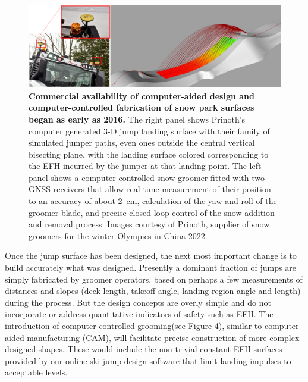 \documentclass[smallextended]{svjour3}       %
\begin{document}
%
\begin{figure}
  \centering
  \includegraphics[width=\columnwidth]{figures/prinoth.png}
  \caption{\textbf{Commercial availability of computer-aided design and
    computer-controlled fabrication of snow park surfaces began as early as
    2016.} The right panel shows Prinoth's computer generated 3-D jump landing
    surface with their family of simulated jumper paths, even ones outside the
    central vertical bisecting plane, with the landing surface colored
    corresponding to the EFH incurred by the jumper at that landing point. The
    left panel shows a computer-controlled snow groomer fitted with two GNSS
    receivers that allow real time measurement of their position to an accuracy
    of about 2~\si{\centi\meter}, calculation of the yaw and roll of the
    groomer blade, and precise closed loop control of the snow addition and
    removal process.  Images courtesy of Prinoth, supplier of snow groomers for
  the winter Olympics in China 2022.}
  \label{fig:prinoth}
\end{figure}

Once the jump surface has been designed, the next most important change is to build accurately what was designed. Presently a dominant fraction of jumps are simply
fabricated by groomer operators, based on perhaps a few measurements of
distances and slopes (deck length, takeoff angle, landing region angle and length) during the process. But the design concepts are overly simple and do not
incorporate or address quantitative indicators of safety such as EFH. The
introduction of computer controlled grooming(see Figure 4), similar to computer aided manufacturing
(CAM), will facilitate precise construction of more complex designed
shapes. These would include the non-trivial constant EFH surfaces provided by
our online ski jump design software that limit landing impulses to acceptable
levels.
\end{document}
